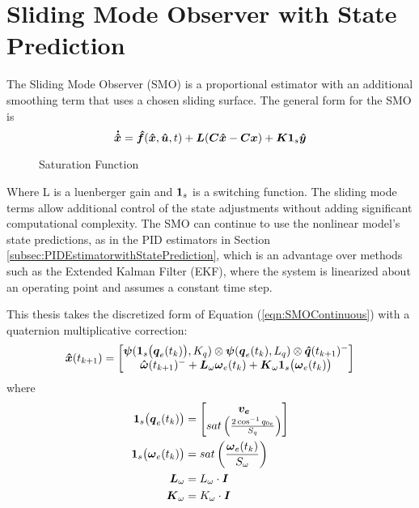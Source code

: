 \section{Sliding Mode Observer with State Prediction}
\label{sec:SlidingModeObserverwithStatePrediction}

The Sliding Mode Observer (SMO) is a proportional estimator with an additional smoothing term that uses a chosen sliding surface.  The general form for the SMO is
\begin{equation}
  \boldsymbol{\dot{\hat{x}}} = \boldsymbol{\hat{f}}(\boldsymbol{\hat{x}}, \boldsymbol{\hat{u}}, t) + \boldsymbol{L}(\boldsymbol{C}\boldsymbol{\hat{x}} - \boldsymbol{C}\boldsymbol{x}) + \boldsymbol{K}\boldsymbol{1}_s\boldsymbol{\hat{y}}
  \label{eqn:SMOContinuous}
\end{equation}

\begin{figure}[ht]
  \centerline{}
  \caption{Saturation Function}
  \label{fig:SaturationFunction}
\end{figure}

Where L is a luenberger gain and $\boldsymbol{1}_s$ is a switching function.  The sliding mode terms allow additional control of the state adjustments without adding significant computational complexity.  The SMO can continue to use the nonlinear model's state predictions, as in the PID estimators in Section \ref{subsec:PIDEstimatorwithStatePrediction}, which is an advantage over methods such as the Extended Kalman Filter (EKF), where the system is linearized about an operating point and assumes a constant time step.

This thesis takes the discretized form of Equation (\ref{eqn:SMOContinuous}) with a quaternion multiplicative correction:
\begin{equation}
  \boldsymbol{\hat{x}}(t_{k+1}) = \begin{bmatrix} \boldsymbol{\psi} (\boldsymbol{1}_s\big(\boldsymbol{q}_{e}(t_k)\big), K_q) \otimes \boldsymbol{\psi}(\boldsymbol{q}_e(t_{k}), L_{q})  \otimes \boldsymbol{\hat{q}}(t_{k+1})^- \\
  \boldsymbol{\hat{\omega}}(t_{k+1})^- + \boldsymbol{L}_{\omega} \boldsymbol{\omega}_e(t_{k}) + \boldsymbol{K}_{\omega}\boldsymbol{1}_s \big(\boldsymbol{\omega}_e(t_{k}) \big) \end{bmatrix}
  \label{eqn:SMOEstimatorwithPredictionUnforcedMotion}
\end{equation}
where
\begin{subequations}
  \begin{align}
    \boldsymbol{1}_s\big(\boldsymbol{q}_{e}(t_k) \big) &= \begin{bmatrix} \boldsymbol{v_e} \\ sat\left( \frac{2\cos^{-1} q_{0e} }{S_{q}} \right) \end{bmatrix} \\
    \boldsymbol{1}_s \big(\boldsymbol{\omega}_e(t_{k}) \big) &= sat\left( \frac{\boldsymbol{\omega}_e(t_{k})}{S_{\omega}} \right) \\
    \boldsymbol{L}_{\omega} &= L_\omega \cdot \boldsymbol{I} \\
    \boldsymbol{K}_{\omega} &= K_\omega \cdot \boldsymbol{I}
  \end{align}
\end{subequations}

